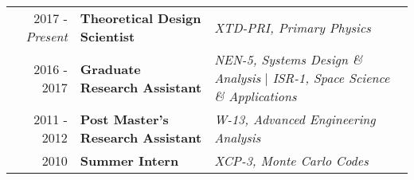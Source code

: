 %
%

\normalsize



\begin{minipage}{\textwidth}
     \begin{tabular}{r|ll}
	     2017 - \emph{Present} & \textbf{Theoretical Design Scientist}  & \textit{XTD-PRI, Primary Physics}  \\
	     2016 - 2017 & \textbf{Graduate Research Assistant}  & \textit{NEN-5, Systems Design \& Analysis} | 
									     \textit{ISR-1, Space Science \& Applications} \\
	     2011 - 2012 & \textbf{Post Master's Research Assistant}  & \textit{W-13, Advanced Engineering Analysis} \\
	     2010 & \textbf{Summer Intern} & \textit{XCP-3, Monte Carlo Codes} \\
     \end{tabular}
\end{minipage}

